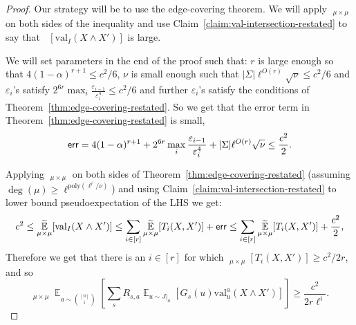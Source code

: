 \documentclass[11pt]{article}
\DeclareMathOperator*{\E}{\mathbb{E}}
\DeclareMathOperator*{\pE}{\widetilde{\mathbb{E}}}
\def \poly {\mathrm{poly}}
\def \eps {{\varepsilon}}
\def \val {\mathrm{val}}
\theoremstyle{definition}
\begin{document}
\begin{proof}
Our strategy will be to use the edge-covering theorem. We will apply $\pE_{\mu \times \mu}$ on both sides of the inequality and use Claim~\ref{claim:val-intersection-restated} to say that $\pE[\val_I(X \wedge X')]$ is large. 

We will set parameters in the end of the proof such that: $r$ is large enough so that $4(1-\alpha)^{r+1} \leq c^2/6$, $\nu$ is small enough such that $|\Sigma|\ell^{O(r)}\sqrt{\nu} \leq c^2/6$ and $\eps_i$'s satisfy $2^{6r}\max_{i}\frac{\eps_{i-1}}{\eps_i^4} \leq c^2/6$ and further $\eps_i$'s satisfy the conditions of Theorem~\ref{thm:edge-covering-restated}. So we get that the error term in Theorem~\ref{thm:edge-covering-restated} is small, 
\begin{equation}\label{eq:error}
{\sf err} = 4(1-\alpha)^{r+1} + 2^{6r}\max_{i}\frac{\eps_{i-1}}{\eps_i^4}+ |\Sigma|\ell^{O(r)}\sqrt{\nu} \leq \frac{c^2}{2}.
\end{equation}

Applying $\pE_{\mu \times \mu}$ on both sides of Theorem~\ref{thm:edge-covering-restated} (assuming $\deg(\mu) \geq \ell^{\poly(\ell^r/\nu)}$) and 
using Claim~\ref{claim:val-intersection-restated} to lower bound pseudoexpectation of the LHS we get:
\[
c^2
\leq
\pE_{\mu \times \mu}[\val_I(X \wedge X')]
\leq \sum_{i \in [r]} \pE_{\mu \times \mu}[T_i(X,X')]+{\sf err}
\leq \sum_{i \in [r]} \pE_{\mu \times \mu}[T_i(X,X')] + \frac{c^2}{2},\]
Therefore we get that there is an $i \in [r]$ for which $\pE_{\mu \times \mu}[T_i(X,X')] \geq c^2/2r$, and so
\begin{equation}\label{eq:low-comp1}
\pE_{\mu \times \mu}\E_{a \sim {[n] \choose i}}[\sum_s R_{s,a} \E_{u \sim J|_a}[G_s(u)\val^a_u(X \wedge X')]] \geq \frac{c^2}{2r\ell^i}.
\end{equation}


\end{proof}
\end{document}
